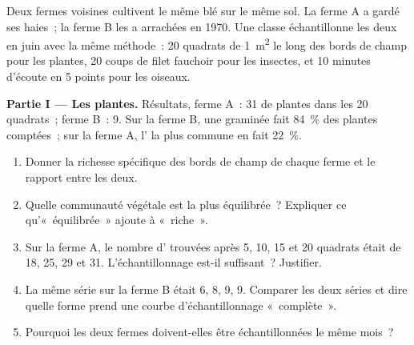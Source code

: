 \begin{problem}
\label{pb:g10:biodiversity-scales:1}
Deux fermes voisines cultivent le même blé sur le même sol. La ferme A
a gardé ses haies~; la ferme B les a arrachées en 1970. Une classe
échantillonne les deux en juin avec la même méthode~: 20 quadrats de
\qty{1}{m^2} le long des bords de champ pour les plantes, 20 coups de
filet fauchoir pour les insectes, et 10 minutes d'écoute en 5 points
pour les oiseaux.

\medskip
\noindent\textbf{Partie I --- Les plantes.}
Résultats, ferme A~: 31  de plantes dans les 20 quadrats~;
ferme B~: 9. Sur la ferme B, une graminée fait 84~\% des plantes
comptées~; sur la ferme A, l' la plus commune en fait 22~\%.
\begin{enumerate}
  \item Donner la richesse spécifique des bords de champ de chaque
        ferme et le rapport entre les deux.
  \item Quelle communauté végétale est la plus équilibrée~? Expliquer
        ce qu'«~équilibrée~» ajoute à «~riche~».
  \item Sur la ferme A, le nombre d' trouvées après 5, 10, 15
        et 20 quadrats était de 18, 25, 29 et 31. L'échantillonnage
        est-il suffisant~? Justifier.
  \item La même série sur la ferme B était 6, 8, 9, 9. Comparer les
        deux séries et dire quelle forme prend une courbe
        d'échantillonnage «~complète~».
  \item Pourquoi les deux fermes doivent-elles être échantillonnées le
        même mois~?
\end{enumerate}


\end{problem}
